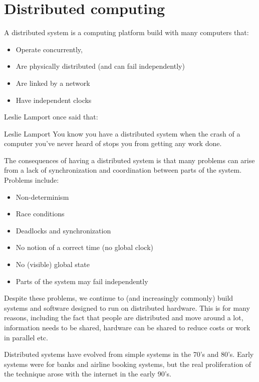
\section{Distributed computing}

A distributed system is a computing platform build with many computers that:

\begin{itemize}
  \item Operate concurrently,
  \item Are physically distributed (and can fail independently)
  \item Are linked by a network
  \item Have independent clocks
\end{itemize}

Leslie Lamport once said that:

\begin{aquote}{Leslie Lamport}
You know you have a distributed system when the crash of a computer you’ve never
heard of stops you from getting any work done.
\end{aquote}

The consequences of having a distributed system is that many problems can arise
from a lack of synchronization and coordination between parts of the system.
Problems include:

\begin{itemize}
  \item Non-determinism
  \item Race conditions
  \item Deadlocks and synchronization
  \item No notion of a correct time (no global clock)
  \item No (visible) global state
  \item Parts of the system may fail independently
\end{itemize}

Despite these problems, we continue to (and increasingly commonly) build systems
and software designed to run on distributed hardware. This is for many reasons,
including the fact that people are distributed and move around a lot, information
needs to be shared, hardware can be shared to reduce costs or work in parallel
etc.

Distributed systems have evolved from simple systems in the 70's and 80's. Early
systems were for banks and airline booking systems, but the real proliferation
of the technique arose with the internet in the early 90's.

